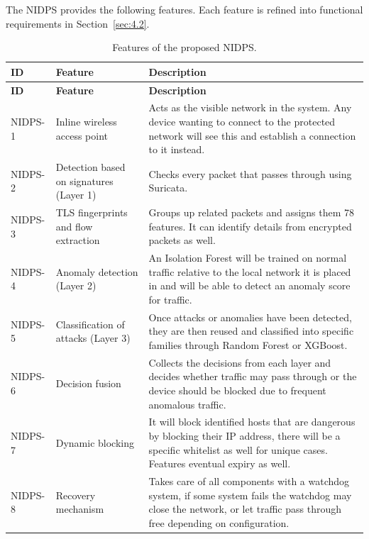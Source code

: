 \noindent The NIDPS provides the following features. Each feature is refined into functional requirements in Section~\ref{sec:4.2}.

{\small
\begin{longtable}{|>{\raggedright\arraybackslash}p{}|>{\raggedright\arraybackslash}p{}|>{\raggedright\arraybackslash}p{}|}
\caption{Features of the proposed NIDPS.}\label{tab:4.1}\\
\hline
\textbf{ID} & \textbf{Feature} & \textbf{Description} \\ \hline
\endfirsthead
\hline
\textbf{ID} & \textbf{Feature} & \textbf{Description} \\ \hline
\endhead
NIDPS-1 & Inline wireless access point & Acts as the visible network in the system. Any device wanting to connect to the protected network will see this and establish a connection to it instead. \\ \hline
NIDPS-2 & Detection based on signatures (Layer 1) & Checks every packet that passes through using Suricata. \\ \hline
NIDPS-3 & TLS fingerprints and flow extraction & Groups up related packets and assigns them 78 features. It can identify details from encrypted packets as well. \\ \hline
NIDPS-4 & Anomaly detection (Layer 2) & An Isolation Forest will be trained on normal traffic relative to the local network it is placed in and will be able to detect an anomaly score for traffic. \\ \hline
NIDPS-5 & Classification of attacks (Layer 3) & Once attacks or anomalies have been detected, they are then reused and classified into specific families through Random Forest or XGBoost. \\ \hline
NIDPS-6 & Decision fusion & Collects the decisions from each layer and decides whether traffic may pass through or the device should be blocked due to frequent anomalous traffic. \\ \hline
NIDPS-7 & Dynamic blocking & It will block identified hosts that are dangerous by blocking their IP address, there will be a specific whitelist as well for unique cases. Features eventual expiry as well. \\ \hline
NIDPS-8 & Recovery mechanism & Takes care of all components with a watchdog system, if some system fails the watchdog may close the network, or let traffic pass through free depending on configuration. \\ \hline

\end{longtable}}

